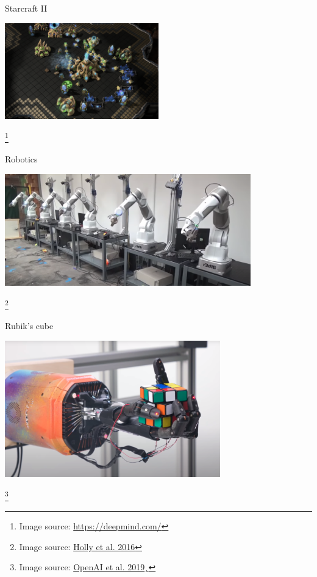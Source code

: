 \begin{frame}[c]{Starcraft II }
	
	\centering
	\includegraphics[width=0.5\textwidth]{images/starcraftii.png}
	
\footnote{Image source: \url{https://deepmind.com/}}
	
\end{frame}
\begin{frame}[c]{Robotics }
	
	\centering
	\includegraphics[width=0.8\textwidth]{images/robotic.png}
	
	\footnote{Image source: \href{https://www.youtube.com/watch?v=ZhsEKTo7V04}{Holly et al. 2016}}
	
\end{frame}
\begin{frame}[c]{Rubik's cube }
	
	\centering
	\includegraphics[width=0.7\textwidth]{images/rubiks_cube.png}
	
	\footnote{Image source: \href{https://openai.com/blog/solving-rubiks-cube/}{OpenAI et al. 2019}¸}
	
\end{frame}


